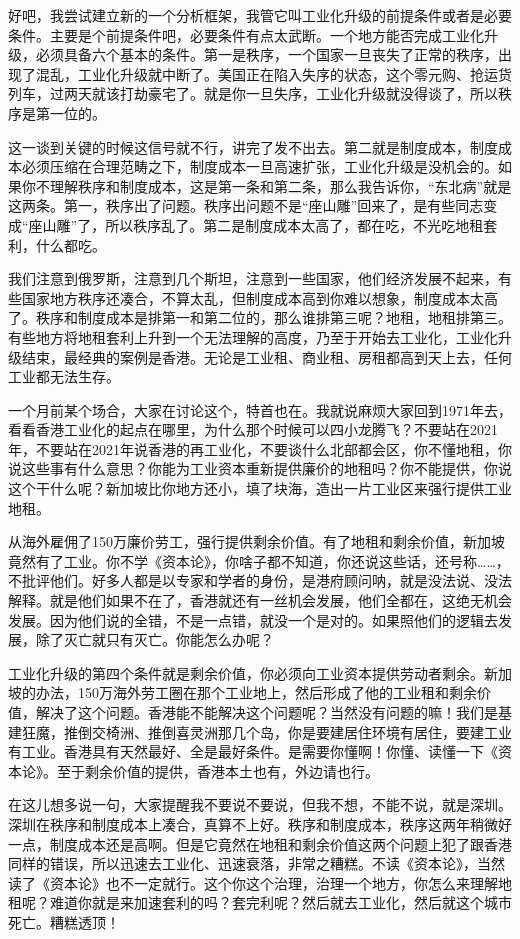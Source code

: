 \documentclass[UTF8, 12pt, a4paper]{ctexrep}
\begin{document}
好吧，我尝试建立新的一个分析框架，我管它叫工业化升级的前提条件或者是必要条件。主要是个前提条件吧，必要条件有点太武断。一个地方能否完成工业化升级，必须具备六个基本的条件。第一是秩序，一个国家一旦丧失了正常的秩序，出现了混乱，工业化升级就中断了。美国正在陷入失序的状态，这个零元购、抢运货列车，过两天就该打劫豪宅了。就是你一旦失序，工业化升级就没得谈了，所以秩序是第一位的。

这一谈到关键的时候这信号就不行，讲完了发不出去。第二就是制度成本，制度成本必须压缩在合理范畴之下，制度成本一旦高速扩张，工业化升级是没机会的。如果你不理解秩序和制度成本，这是第一条和第二条，那么我告诉你，“东北病”就是这两条。第一，秩序出了问题。秩序出问题不是“座山雕”回来了，是有些同志变成“座山雕”了，所以秩序乱了。第二是制度成本太高了，都在吃，不光吃地租套利，什么都吃。

我们注意到俄罗斯，注意到几个斯坦，注意到一些国家，他们经济发展不起来，有些国家地方秩序还凑合，不算太乱，但制度成本高到你难以想象，制度成本太高了。秩序和制度成本是排第一和第二位的，那么谁排第三呢？地租，地租排第三。有些地方将地租套利上升到一个无法理解的高度，乃至于开始去工业化，工业化升级结束，最经典的案例是香港。无论是工业租、商业租、房租都高到天上去，任何工业都无法生存。

一个月前某个场合，大家在讨论这个，特首也在。我就说麻烦大家回到1971年去，看看香港工业化的起点在哪里，为什么那个时候可以四小龙腾飞？不要站在2021年，不要站在2021年说香港的再工业化，不要谈什么北部都会区，你不懂地租，你说这些事有什么意思？你能为工业资本重新提供廉价的地租吗？你不能提供，你说这个干什么呢？新加坡比你地方还小，填了块海，造出一片工业区来强行提供工业地租。

从海外雇佣了150万廉价劳工，强行提供剩余价值。有了地租和剩余价值，新加坡竟然有了工业。你不学《资本论》，你啥子都不知道，你还说这些话，还号称……，不批评他们。好多人都是以专家和学者的身份，是港府顾问呐，就是没法说、没法解释。就是他们如果不在了，香港就还有一丝机会发展，他们全都在，这绝无机会发展。因为他们说的全错，不是一点错，就没一个是对的。如果照他们的逻辑去发展，除了灭亡就只有灭亡。你能怎么办呢？

工业化升级的第四个条件就是剩余价值，你必须向工业资本提供劳动者剩余。新加坡的办法，150万海外劳工圈在那个工业地上，然后形成了他的工业租和剩余价值，解决了这个问题。香港能不能解决这个问题呢？当然没有问题的嘛！我们是基建狂魔，推倒交椅洲、推倒喜灵洲那几个岛，你是要建居住环境有居住，要建工业有工业。香港具有天然最好、全是最好条件。是需要你懂啊！你懂、读懂一下《资本论》。至于剩余价值的提供，香港本土也有，外边请也行。

在这儿想多说一句，大家提醒我不要说不要说，但我不想，不能不说，就是深圳。深圳在秩序和制度成本上凑合，真算不上好。秩序和制度成本，秩序这两年稍微好一点，制度成本还是高啊。但是它竟然在地租和剩余价值这两个问题上犯了跟香港同样的错误，所以迅速去工业化、迅速衰落，非常之糟糕。不读《资本论》，当然读了《资本论》也不一定就行。这个你这个治理，治理一个地方，你怎么来理解地租呢？难道你就是来加速套利的吗？套完利呢？然后就去工业化，然后就这个城市死亡。糟糕透顶！
\end{document}
